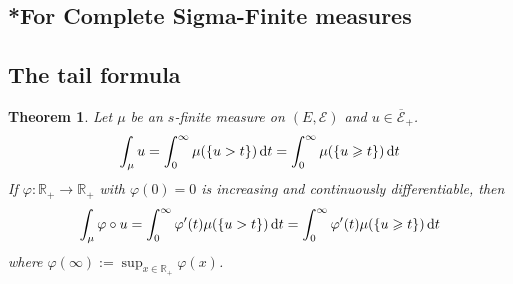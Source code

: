 \documentclass[11pt, a4paper, openany]{book}
\newtheorem{thm}{Theorem}\newtheorem{lem}{Lemma}\newtheorem{crl}{Corollary}
\theoremstyle{definition}
\newcommand{\mf}[1]{\overline{\mathscr{#1}}}
\begin{document}
\subsection{*For Complete Sigma-Finite measures}
\subsection{The tail formula}
    \begin{thm}\label{thm:tail_formula}
        Let $\mu$ be an $s$-finite measure on $(E,\mathscr{E})$ and $u\in\mf{E}_+$.
        \begin{equation}\label{eq:tail_formula}
            \int_\mu u=\int_0^\infty \mu(\{u>t\})\odif t=\int_0^\infty \mu(\{u\geqslant t\})\odif t
        \end{equation}
        If $\varphi:\mathbb{R}_+\rightarrow\mathbb{R}_+$ with $\varphi(0)=0$ is increasing and continuously differentiable, then
        \begin{equation}\label{eq:tail_formula_generalized}
            \int_\mu \varphi\circ u=\int_0^\infty \varphi'(t)\mu(\{u> t\})\odif t=\int_0^\infty \varphi'(t)\mu(\{u\geqslant t\})\odif t
        \end{equation}
        where $\varphi(\infty):=\sup_{x\in\mathbb{R}_+}\varphi(x)$.
    \end{thm}
\end{document}
